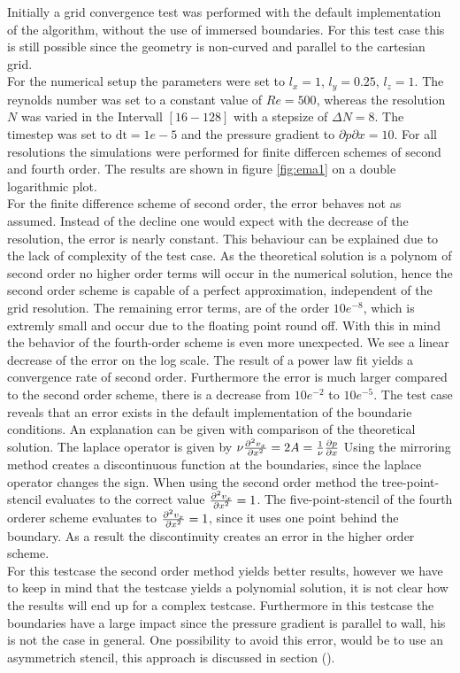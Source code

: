 Initially a grid convergence test was performed with the default implementation of the algorithm, without the use of immersed boundaries.
For this test case this is still possible since the geometry is non-curved and parallel to the cartesian grid.\\
For the  numerical setup the parameters were set to $l_x=1$, $l_y=0.25$, $l_z=1$.
The reynolds number was set to a constant value of $Re=500$, whereas the resolution $N$ was varied in the Intervall $[16 - 128]$ with a stepsize of $\Delta N = 8$.
The timestep was set to $\mathrm{dt}=1e-5$ and the pressure gradient to $\partial p \partial x  = 10$.
For all resolutions the simulations were performed for finite differcen schemes of second and fourth order.
The results are shown in figure \ref{fig:ema1} on a double logarithmic plot.\\
For the finite difference scheme of second order, the error behaves not as assumed.
Instead of the decline one would expect with the decrease of the resolution, the  error is nearly constant.
This behaviour can be explained due to the lack of complexity of the test case. As the theoretical solution is a polynom of second order
no higher order terms will occur in the numerical solution, hence the second order scheme is capable of a perfect approximation, independent of the
grid resolution. The remaining error terms, are of the order $10e^{-8}$, which is extremly small and occur due to the floating point round off.
With this in mind the behavior of the fourth-order scheme is even more unexpected.
We see a linear decrease of the error on the log scale.
The result of a power law fit yields a convergence rate of second order.
Furthermore the error is much larger compared to the second order scheme, there is a decrease from $10e^{-2}$ to $10e^{-5}$.
The test case reveals that an error exists in the default implementation of the boundarie conditions.
An explanation can be given with comparison of the theoretical solution. The laplace operator is given by
 $ \nu \pdn[^2 v_x]{x^2} = 2A = \frac{1}{\nu}\pdn[p]{x}$
Using the mirroring method creates a discontinuous function at the boundaries, since the laplace operator changes the sign.
When using the second order method the tree-point-stencil evaluates to the correct value $\pdn[^2 v_x]{x^2} = 1$.
The five-point-stencil of the fourth orderer scheme evaluates to $\pdn[^2 v_x]{x^2} = 1$, since it uses one point behind the boundary.
As a result the discontinuity creates an error in the higher order scheme.\\
For this testcase the second order method yields better results, however we
have to keep in mind that the testcase yields a polynomial solution,
it is not clear how the results will end up for a complex testcase.
Furthermore in this testcase the boundaries have a large impact since the pressure gradient is parallel to wall,
his is not the case in general.
One possibility to avoid this error, would be to use an asymmetrich stencil, this approach is discussed in section ().

